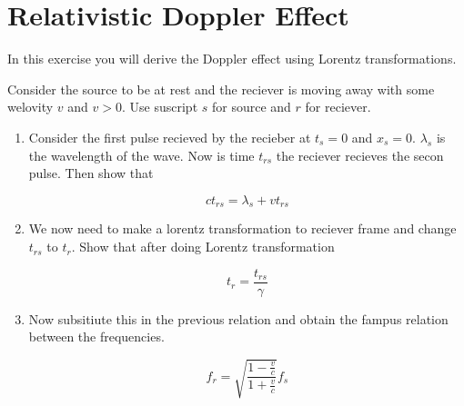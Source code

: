 \documentclass[10pt,a4paper]{article}
\begin{document}
\section{Relativistic Doppler Effect}

In this exercise you will derive the Doppler effect using Lorentz transformations. 

Consider the source to be at rest and the reciever is moving away with some welovity $v$ and $v>0$. Use suscript $s$ for source and $r$ for reciever.

\begin{enumerate}
\item Consider the first pulse recieved by the recieber at $t_s = 0$ and $x_s = 0$. $\lambda_s$ is the wavelength of the wave. Now is time $t_{rs}$ the reciever recieves the secon pulse. Then show that

$$ c t_{rs} = \lambda_s + v t_{rs} $$

\item We now need to make a lorentz transformation to reciever frame and change $t_{rs}$ to $t_{r}$. Show that after doing Lorentz transformation

$$ t_{r} = \frac{t_{rs}}{\gamma}$$

\item Now subsitiute this in the previous relation and obtain the fampus relation between the frequencies.

$$ f_{r} = \sqrt{\frac{1- \frac{v}{c}}{1+ \frac{v}{c}}} f_{s} $$

\end{enumerate}
\end{document}
